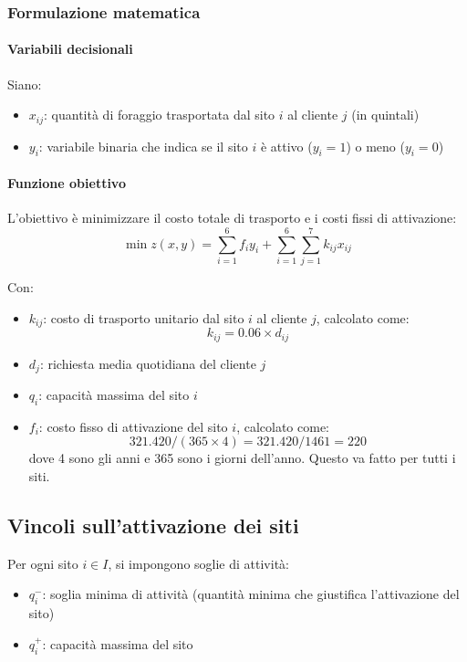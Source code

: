 \subsubsection{Formulazione matematica}

\paragraph{Variabili decisionali}
Siano:
\begin{itemize}
    \item $x_{ij}$: quantità di foraggio trasportata dal sito $i$ al cliente $j$ (in quintali)
    \item $y_i$: variabile binaria che indica se il sito $i$ è attivo ($y_i = 1$) o meno ($y_i = 0$)
\end{itemize}

\paragraph{Funzione obiettivo}
L'obiettivo è minimizzare il costo totale di trasporto e i costi fissi di attivazione:
\[
\min z(x, y) = \sum_{i=1}^{6} f_i y_i + \sum_{i=1}^{6} \sum_{j=1}^{7} k_{ij} x_{ij}
\]

Con:
\begin{itemize}
    \item $k_{ij}$: costo di trasporto unitario dal sito $i$ al cliente $j$, calcolato come:
    \[
    k_{ij} = 0.06 \times d_{ij}
    \]
    \item $d_{j}$: richiesta media quotidiana del cliente $j$
    \item $q_{i}$: capacità massima del sito $i$
    \item $f_i$: costo fisso di attivazione del sito $i$, calcolato come:
    \[
    321.420 / (365 \times 4) = 321.420/1461 = 220
    \] 
    dove 4 sono gli anni e 365 sono i giorni dell'anno. Questo va fatto per tutti i siti.
\end{itemize}

\subsection{Vincoli sull'attivazione dei siti}

Per ogni sito $i \in I$, si impongono soglie di attività:
\begin{itemize}
    \item $q_i^-$: soglia minima di attività (quantità minima che giustifica l'attivazione del sito)
    \item $q_i^+$: capacità massima del sito
\end{itemize}

